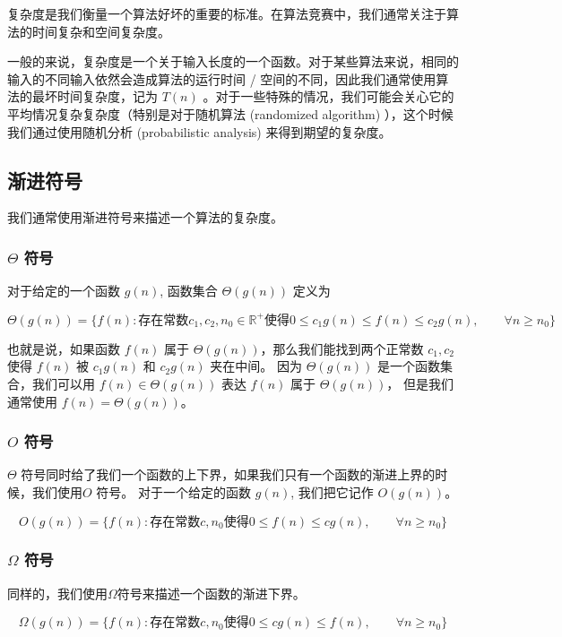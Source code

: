 
复杂度是我们衡量一个算法好坏的重要的标准。在算法竞赛中，我们通常关注于算法的时间复杂和空间复杂度。 

一般的来说，复杂度是一个关于输入长度的一个函数。对于某些算法来说，相同的输入的不同输入依然会造成算法的运行时间 / 空间的不同，因此我们通常使用算法的最坏时间复杂度，记为 $T(n)$ 。对于一些特殊的情况，我们可能会关心它的平均情况复杂复杂度（特别是对于随机算法 (randomized algorithm) ），这个时候我们通过使用随机分析 (probabilistic analysis) 来得到期望的复杂度。

\subsection{渐进符号}

我们通常使用渐进符号来描述一个算法的复杂度。

\subsubsection{$\Theta$ 符号}

对于给定的一个函数 $g(n)$, 函数集合 $\Theta(g(n))$ 定义为

$$
\Theta(g(n)) = \{f(n) : 存在常数 c_1,c_2,n_0 \in \mathbb{R^{+}}使得 0 \leq c_1g(n) \leq f(n) \leq c_2g(n), \qquad \forall n \geq n_0\}
$$

也就是说，如果函数 $f(n)$ 属于 $\Theta(g(n))$，那么我们能找到两个正常数 $c_1, c_2$ 使得 $f(n)$ 被 $c_1g(n)$ 和 $c_2g(n)$ 夹在中间。 因为 $\Theta(g(n))$ 是一个函数集合，我们可以用 $f(n) \in \Theta(g(n))$ 表达 $f(n)$ 属于 $\Theta(g(n))$， 但是我们通常使用 $f(n) = \Theta(g(n))$。

\subsubsection{$O$ 符号}

$\Theta$ 符号同时给了我们一个函数的上下界，如果我们只有一个函数的渐进上界的时候，我们使用$O$ 符号。 对于一个给定的函数 $g(n)$, 我们把它记作 $O(g(n))$。

$$
O(g(n)) = \{f(n):存在常数 c,n_0 使得 0\leq f(n) \leq cg(n), \qquad \forall n \geq n_0\}
$$

\subsubsection{$\Omega$ 符号}

同样的，我们使用$\Omega$符号来描述一个函数的渐进下界。

$$
\Omega(g(n)) = \{f(n):存在常数 c,n_0 使得 0 \leq cg(n) \leq f(n) , \qquad \forall n \geq n_0\}
$$

